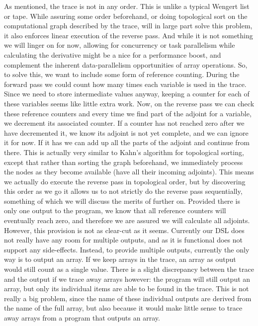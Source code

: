     As mentioned, the trace is not in any order.
    This is unlike a typical Wengert list or tape.
    While assuring some order beforehand, or doing topological sort on the computational graph described by the trace, will in large part solve this problem, it also enforces linear execution of the reverse pass.
    And while it is not something we will linger on for now, allowing for concurrency or task parallelism while calculating the derivative might be a nice for a performance boost, and complement the inherent data-parallelism opportunities of array operations.
    So, to solve this, we want to include some form of reference counting.
    During the forward pass we could count how many times each variable is used in the trace.
    Since we need to store intermediate values anyway, keeping a counter for each of these variables seems like little extra work.
    Now, on the reverse pass we can check these reference counters and every time we find part of the adjoint for a variable, we decrement its associated counter.
    If a counter has not reached zero after we have decremented it, we know its adjoint is not yet complete, and we can ignore it for now.
    If it has we can add up all the parts of the adjoint and continue from there.
    This is actually very similar to Kahn's algorithm for topological sorting\cite{kahn1962topological}, except that rather than sorting the graph beforehand, we immediately process the nodes as they become available (have all their incoming adjoints).
    This means we actually do execute the reverse pass in topological order, but by discovering this order as we go it allows us to not strictly do the reverse pass sequentially, something of which we will discuss the merits of further on.
    Provided there is only one output to the program, we know that all reference counters will eventually reach zero, and therefore we are assured we will calculate all adjoints.
    However, this provision is not as clear-cut as it seems.
    Currently our DSL does not really have any room for multiple outputs, and as it is functional does not support any side-effects.
    Instead, to provide multiple outputs, currently the only way is to output an array.
    If we keep arrays in the trace, an array as output would still count as a single value.
    There is a slight discrepancy between the trace and the output if we trace away arrays however: the program will still output an array, but only its individual items are able to be found in the trace.
    This is not really a big problem, since the name of these individual outputs are derived from the name of the full array, but also because it would make little sense to trace away arrays from a program that outputs an array.

